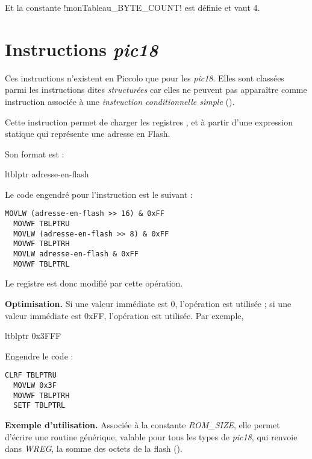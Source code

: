 Et la constante \pic!monTableau_BYTE_COUNT! est définie et vaut 4.



\section{Instructions \emph{pic18}}

Ces instructions n'existent en Piccolo que pour les \emph{pic18}. Elles sont classées parmi les instructions dites \emph{structurées} car elles ne peuvent pas apparaître comme instruction associée à une \emph{instruction conditionnelle simple} ().




Cette instruction permet de charger les registres ,  et  à partir d'une expression statique qui représente une adresse en Flash.

Son format est :
\begin{piccolo}
  ltblptr adresse-en-flash
\end{piccolo}

Le code engendré pour l'instruction est le suivant :
\begin{lstlisting}[language=assembleur]
  MOVLW (adresse-en-flash >> 16) & 0xFF
  MOVWF TBLPTRU
  MOVLW (adresse-en-flash >> 8) & 0xFF
  MOVWF TBLPTRH
  MOVLW adresse-en-flash & 0xFF
  MOVWF TBLPTRL
\end{lstlisting}

Le registre  est donc modifié par cette opération.

\textbf{Optimisation.} Si une valeur immédiate est 0, l'opération  est utilisée ; si une valeur immédiate est 0xFF, l'opération  est utilisée. Par exemple, 
\begin{piccolo}
  ltblptr 0x3FFF
\end{piccolo}

Engendre le code :
\begin{lstlisting}[language=assembleur]
  CLRF TBLPTRU
  MOVLW 0x3F
  MOVWF TBLPTRH
  SETF TBLPTRL
\end{lstlisting}


\textbf{Exemple d'utilisation.} Associée à la constante \emph{ROM\_SIZE}, elle permet d'écrire une routine générique, valable pour tous les types de \emph{pic18}, qui renvoie dans \emph{WREG}, la somme des octets de la flash ().


